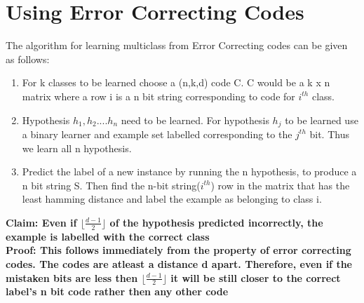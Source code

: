 \documentclass[11pt]{article}
\begin{document}
\section{Using Error Correcting Codes}
    The algorithm for learning multiclass from Error Correcting codes can be given as follows:
    \begin{enumerate}
        \item For k classes to be learned choose a (n,k,d) code C. C would be a k x n matrix where a row i is a n bit string corresponding to code for $i^{th}$ class.
        \item Hypothesis $h_1,h_2....h_n$ need to be learned. For hypothesis $h_j$ to be learned use a binary learner and example set labelled corresponding to the $j^{th}$ bit. Thus we learn all n hypothesis.
        \item Predict the label of a new instance by running the n hypothesis, to produce a n bit string S. Then find the n-bit string($i^{th}$) row in the matrix that has the least hamming distance and label the example as belonging to class i.
    \end{enumerate}
    \bf Claim: \normalfont Even if $\lfloor\frac{d-1}{2}\rfloor$ of the hypothesis predicted incorrectly, the example is labelled with the correct class\\
    \bf Proof: \normalfont This follows immediately from the property of error correcting codes. The codes are atleast a distance d apart. Therefore, even if the mistaken bits are less then $\lfloor\frac{d-1}{2}\rfloor$ it will be still closer to the correct label's n bit code rather then any other code
    
\end{document}
